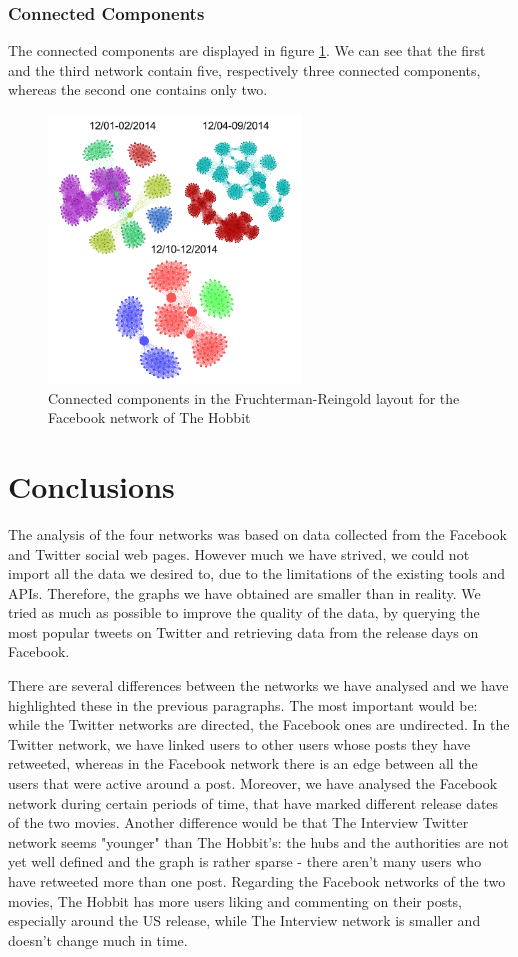 \documentclass{llncs}
\begin{document}
\subsubsection{Connected Components}
The connected components are displayed in figure \ref{fig:hobbit-facebook-cc}.
We can see that the first and the third network contain five, respectively three
connected components, whereas the second one contains only two.
%
\begin{figure}
\centering
\includegraphics[width=0.6\textwidth]{hobbit-facebook-cc.png}
\caption{Connected components in the Fruchterman-Reingold layout for the
    Facebook network of The Hobbit
\label{fig:hobbit-facebook-cc}}
\end{figure}
%
\section{Conclusions}
The analysis of the four networks was based on data collected from the Facebook
and Twitter social web pages. However much we have strived, we could not import
all the data we desired to, due to the limitations of the existing tools and
APIs. Therefore, the graphs we have obtained are smaller than in reality. We
tried as much as possible to improve the quality of the data, by querying the
most popular tweets on Twitter and retrieving data from the release days on
Facebook.

There are several differences between the networks we have analysed and we have
highlighted these in the previous paragraphs. The most important would be: while
the Twitter networks are directed, the Facebook ones are undirected. In the
Twitter network, we have linked users to other users whose posts they have
retweeted, whereas in the Facebook network there is an edge between all the
users that were active around a post. Moreover, we have analysed the Facebook
network during certain periods of time, that have marked different release dates
of the two movies. Another difference would be that The Interview Twitter
network seems "younger" than The Hobbit's: the hubs and the authorities are not
yet well defined and the graph is rather sparse - there aren't many users who
have retweeted more than one post. Regarding the Facebook networks of the two
movies, The Hobbit has more users liking and commenting on their posts,
especially around the US release, while The Interview network is smaller and
doesn't change much in time.
%
\end{document}
